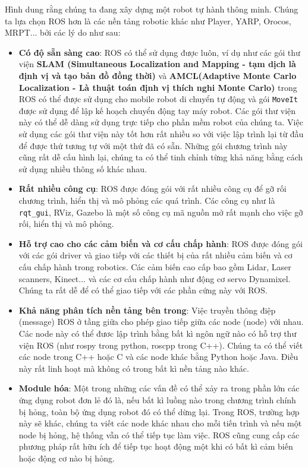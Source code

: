 Hình dung rằng chúng ta đang xây dựng một robot tự hành thông minh. Chúng ta lựa chọn ROS hơn là các nền tảng robotic khác như Player, YARP, Orocos, MRPT... bởi các lý do như sau:
\begin{itemize}
	\item \textbf{Có độ sẵn sàng cao}: ROS có thể sử dụng được luôn, ví dụ như các gói thư viện \textbf{SLAM (Simultaneous Localization and Mapping - tạm dịch là định vị và tạo bản đồ đồng thời)} và \textbf{AMCL(Adaptive Monte Carlo Localization - Là thuật toán định vị thích nghi Monte Carlo)} trong ROS có thể được sử dụng cho mobile robot di chuyển tự động và gói {\tt MoveIt} được sử dụng để lập kế hoạch chuyển động tay máy robot. Các gói thư viện này có thể dễ dàng sử dụng trực tiếp cho phần mềm robot của chúng ta. Việc sử dụng các gói thư viện này tốt hơn rất nhiều so với việc lập trình lại từ đầu để được thứ tương tự với một thứ đã có sẵn. Những gói chương trình này cũng rất dễ cấu hình lại, chúng ta có thể tinh chỉnh từng khả năng bằng cách sử dụng nhiều thông số khác nhau.
	\item \textbf{Rất nhiều công cụ}: ROS được đóng gói với rất nhiều công cụ để gỡ rối chương trình, hiển thị và mô phỏng các quá trình. Các công cụ như là {\tt rqt\_gui}, RViz, Gazebo là một số công cụ mã nguồn mở rất mạnh cho việc gỡ rối, hiển thị và mô phỏng.
	\item \textbf{Hỗ trợ cao cho các cảm biến và cơ cấu chấp hành}: ROS được đóng gói với các gói driver và giao tiếp với các thiết bị của rất nhiều cảm biến và cơ cấu chấp hành trong robotics. Các cảm biến cao cấp bao gồm Lidar, Laser scanners, Kinect... và các cơ cấu chấp hành như động cơ servo Dynamixel. Chúng ta rất dễ để có thể giao tiếp với các phần cứng này với ROS.
	\item \textbf{Khả năng phân tích nền tảng bên trong}: Việc truyền thông điệp (message) ROS ở tầng giữa cho phép giao tiếp giữa các node (node) với nhau. Các node này có thể đươc lập trình bằng bất kì ngôn ngữ nào có hỗ trợ thư viện ROS (như rospy trong python, roscpp trong C++). Chúng ta có thể viết các node trong C++ hoặc C và các node khác bằng Python hoặc Java. Điều này rất linh hoạt mà không có trong bất kì nền tảng nào khác.
	\item \textbf{Module hóa}: Một trong những các vấn đề có thể xảy ra trong phần lớn các ứng dụng robot đơn lẻ đó là, nếu bất kì luồng nào trong chương trình chính bị hỏng, toàn bộ ứng dụng robot đó có thể dừng lại. Trong ROS, trường hợp này sẽ khác, chúng ta viết các node khác nhau cho mỗi tiến trình và nếu một node bị hỏng, hệ thống vẫn có thể tiếp tục làm việc. ROS cũng cung cấp các phương pháp rất hữu ích để tiếp tục hoạt động một khi có bất kì cảm biến hoặc động cơ nào bị hỏng.

\end{itemize}
